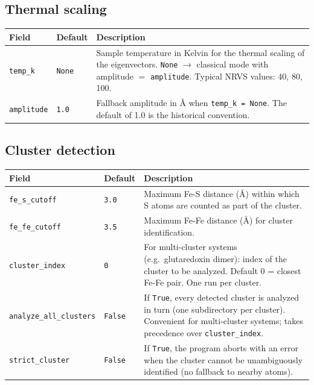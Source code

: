 \documentclass[11pt,a4paper,twoside]{article}
\theoremstyle{remark}
\begin{document}
\subsection{Thermal scaling}

\begin{longtable}{p{} p{} p{}}
\toprule
\textbf{Field} & \textbf{Default} & \textbf{Description} \\
\midrule
\endhead
\texttt{temp\_k}       & \texttt{None} & Sample temperature in
  Kelvin for the thermal scaling of the eigenvectors.
  \texttt{None} $\to$ classical mode with amplitude $=$
  \texttt{amplitude}. Typical NRVS values: 40, 80, 100. \\
\texttt{amplitude}      & \texttt{1.0}  & Fallback amplitude in
  \AA{} when \texttt{temp\_k = None}. The default of 1.0 is the
  historical convention. \\
\bottomrule
\end{longtable}

\subsection{Cluster detection}

\begin{longtable}{p{} p{} p{}}
\toprule
\textbf{Field} & \textbf{Default} & \textbf{Description} \\
\midrule
\endhead
\texttt{fe\_s\_cutoff}  & \texttt{3.0} & Maximum Fe-S distance
  (\AA{}) within which S atoms are counted as part of the
  cluster. \\
\texttt{fe\_fe\_cutoff} & \texttt{3.5} & Maximum Fe-Fe distance
  (\AA{}) for cluster identification. \\
\texttt{cluster\_index} & \texttt{0}   & For multi-cluster systems
  (e.g.\ glutaredoxin dimer): index of the cluster to be
  analyzed. Default 0 = closest Fe-Fe pair. One run per cluster. \\
\texttt{analyze\_all\_clusters} & \texttt{False} & If \texttt{True},
  every detected cluster is analyzed in turn (one subdirectory per
  cluster). Convenient for multi-cluster systems; takes precedence
  over \texttt{cluster\_index}. \\
\texttt{strict\_cluster} & \texttt{False} & If \texttt{True}, the
  program aborts with an error when the cluster cannot be
  unambiguously identified (no fallback to nearby atoms). \\
\bottomrule
\end{longtable}
\end{document}
